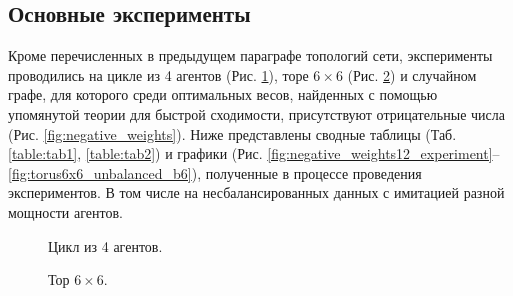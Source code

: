 \documentclass[a4paper,article,14pt]{extarticle}
\begin{document}
\subsection{Основные эксперименты}
Кроме перечисленных в предыдущем параграфе топологий сети, эксперименты проводились на цикле из 4 агентов (Рис. \ref{fig:cycle4}), торе $6\times 6$ (Рис. \ref{fig:torus6x6}) и случайном графе, для которого среди оптимальных весов, найденных с помощью упомянутой теории для быстрой сходимости, присутствуют отрицательные числа (Рис. \ref{fig:negative_weights}).
Ниже представлены сводные таблицы (Таб. \ref{table:tab1}, \ref{table:tab2}) и графики (Рис. \ref{fig:negative_weights12_experiment}--\ref{fig:torus6x6_unbalanced_b6}), полученные в процессе проведения экспериментов. В том числе на несбалансированных данных с имитацией разной мощности агентов.

\begin{figure}[H]
\begin{center}
\caption{ \label{fig:cycle4}
     Цикл из 4 агентов.}
\end{center}
\end{figure}

\begin{figure}[H]
\begin{center}
\caption{ \label{fig:torus6x6}
     Тор $6\times 6$.}
\end{center}
\end{figure}
\end{document}
